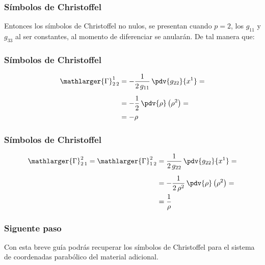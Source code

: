 \begin{frame}
\frametitle{Símbolos de Christoffel}
Entonces los símbolos de Christoffel no nulos, se presentan cuando $p = 2$, los $g_{11}$ y $g_{33}$ al ser constantes, al momento de diferenciar se anularán.
\pause
De tal manera que:
\end{frame}
\begin{frame}
\frametitle{Símbolos de Christoffel}
\begin{align*}
\mathlarger{\Gamma}_{2 \, 2}^{1} &= - \dfrac{1}{2 \, g_{11}} \, \pdv{g_{22}}{x^{1}} = \\[0.5em]
&= - \dfrac{1}{2} \, \pdv{\rho} \left( \rho^{2} \right) = \\[0.em]
&= - \rho
\end{align*}
\end{frame}
\begin{frame}
\frametitle{Símbolos de Christoffel}
\begin{align*}
\mathlarger{\Gamma}_{2 \, 1}^{2} = \mathlarger{\Gamma}_{1 \, 2}^{2}&=  \dfrac{1}{2 \, g_{22}} \, \pdv{g_{22}}{x^{1}} = \\[0.5em]
&= - \dfrac{1}{2 \, \rho^{2}} \, \pdv{\rho} \left( \rho^{2} \right) = \\[0.em]
&= \dfrac{1}{\rho}
\end{align*}
\end{frame}
\begin{frame}
\frametitle{Siguente paso}
Con esta breve guía podrás recuperar los símbolos de Christoffel para el sistema de coordenadas parabólico del material adicional.
\end{frame}



